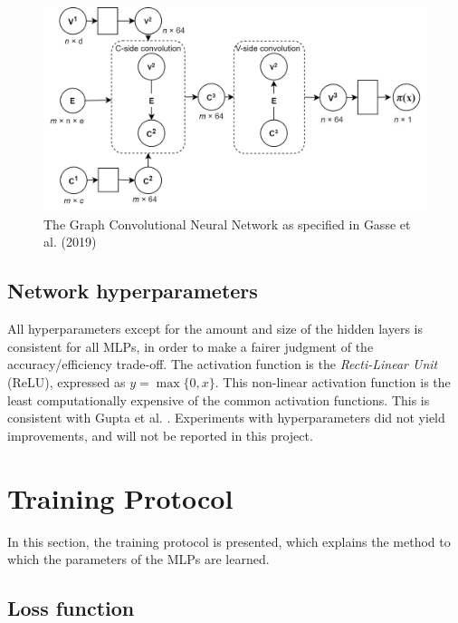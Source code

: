 \begin{figure}
    \centering
    \includegraphics[width=\linewidth]{img/gnn_1.png}
    \caption{The Graph Convolutional Neural Network as specified in Gasse et al. (2019) \cite{gasse2019exact}}
    \label{fig:bipartite}
\end{figure}







\subsection{Network hyperparameters}

All hyperparameters except for the amount and size of the hidden layers is consistent for all \gls{MLP}s, in order to make a fairer judgment of the accuracy/efficiency trade-off. The activation function is the \textit{Recti-Linear Unit} (ReLU), expressed as $y = \max \{ 0, x\}$. This non-linear activation function is the least computationally expensive of the common activation functions. This is consistent with Gupta et al. \cite{gupta2020hybrid}. Experiments with hyperparameters did not yield improvements, and will not be reported in this project. 


\section{Training Protocol}\label{sec:trainingprotocol}

In this section, the training protocol is presented, which explains the method to which the parameters of the \gls{MLP}s are learned.


\subsection{Loss function}

